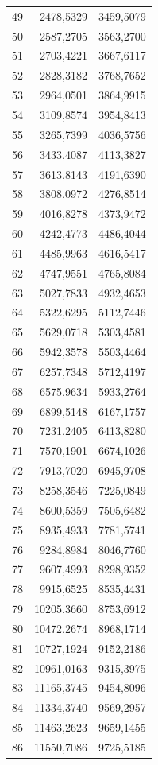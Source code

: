 \begin{small}
\begin{longtable}{rrr}
49 & 2478,5329 & 3459,5079 \\
50 & 2587,2705 & 3563,2700 \\
51 & 2703,4221 & 3667,6117 \\
52 & 2828,3182 & 3768,7652 \\
53 & 2964,0501 & 3864,9915 \\
54 & 3109,8574 & 3954,8413 \\
55 & 3265,7399 & 4036,5756 \\
56 & 3433,4087 & 4113,3827 \\
57 & 3613,8143 & 4191,6390 \\
58 & 3808,0972 & 4276,8514 \\
59 & 4016,8278 & 4373,9472 \\
60 & 4242,4773 & 4486,4044 \\
61 & 4485,9963 & 4616,5417 \\
62 & 4747,9551 & 4765,8084 \\
63 & 5027,7833 & 4932,4653 \\
64 & 5322,6295 & 5112,7446 \\
65 & 5629,0718 & 5303,4581 \\
66 & 5942,3578 & 5503,4464 \\
67 & 6257,7348 & 5712,4197 \\
68 & 6575,9634 & 5933,2764 \\
69 & 6899,5148 & 6167,1757 \\
70 & 7231,2405 & 6413,8280 \\
71 & 7570,1901 & 6674,1026 \\
72 & 7913,7020 & 6945,9708 \\
73 & 8258,3546 & 7225,0849 \\
74 & 8600,5359 & 7505,6482 \\
75 & 8935,4933 & 7781,5741 \\
76 & 9284,8984 & 8046,7760 \\
77 & 9607,4993 & 8298,9352 \\
78 & 9915,6525 & 8535,4431 \\
79 & 10205,3660 & 8753,6912 \\
80 & 10472,2674 & 8968,1714 \\
81 & 10727,1924 & 9152,2186 \\
82 & 10961,0163 & 9315,3975 \\
83 & 11165,3745 & 9454,8096 \\
84 & 11334,3740 & 9569,2957 \\
85 & 11463,2623 & 9659,1455 \\
86 & 11550,7086 & 9725,5185 \\

\end{longtable}
\end{small}
